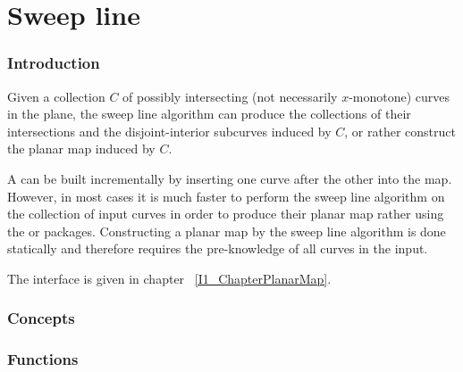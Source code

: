 \chapter{Sweep line}

\subsection*{Introduction}

Given a collection $C$ of possibly intersecting 
(not necessarily $x$-monotone) curves in the plane, 
the sweep line algorithm can produce the collections of their 
intersections and the disjoint-interior subcurves induced by $C$, or rather 
construct the planar map induced by $C$.

A  can be built incrementally by
inserting one curve after the other into the map. 
However, in most cases it is much faster to perform the sweep line algorithm on
the collection of input curves in order to produce their planar map 
rather using the  
or  packages.
Constructing a planar map by the sweep line algorithm is done statically and
therefore requires the pre-knowledge of all curves in the input.



The interface is given in chapter ~\ref{I1_ChapterPlanarMap}.

\begin{ccTexOnly}

\subsection*{Concepts}

\subsection*{Functions}
\\
\\
\\

\end{ccTexOnly}    

